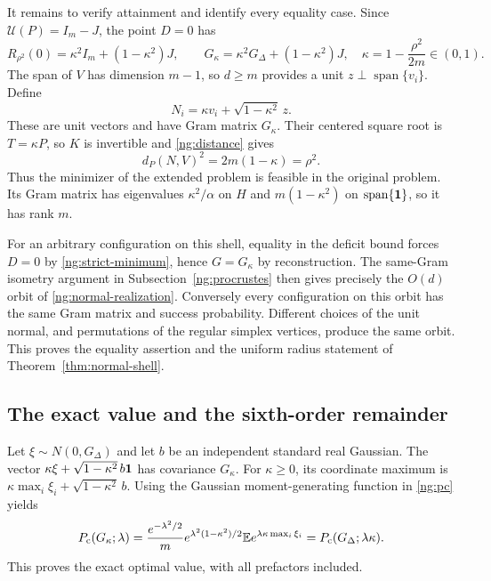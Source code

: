 It remains to verify attainment and identify every equality case.
Since $\mathcal U(P)=I_m-J$, the point $D=0$ has
\[
 R_{\rho^2}(0)=\kappa^2I_m+(1-\kappa^2)J,\qquad
 G_\kappa=\kappa^2G_\Delta+(1-\kappa^2)J,
 \quad \kappa=1-\frac{\rho^2}{2m}\in(0,1).
\]
The span of $V$ has dimension $m-1$, so $d\ge m$ provides a unit
$z\perp\operatorname{span}\{v_i\}$. Define
\begin{equation}\label{ng:normal-realization}
 N_i=\kappa v_i+\sqrt{1-\kappa^2}\,z.
\end{equation}
These are unit vectors and have Gram matrix $G_\kappa$.
Their centered square root is $T=\kappa P$, so $K$ is invertible and
\eqref{ng:distance} gives
\[
 d_P(N,V)^2=2m(1-\kappa)=\rho^2.
\]
Thus the minimizer of the extended problem is feasible in the original
problem. Its Gram matrix has eigenvalues $\kappa^2/\alpha$ on $H$
and $m(1-\kappa^2)$ on $\operatorname{span}\{\mathbf 1\}$, so it has rank $m$.

For an arbitrary configuration on this shell, equality in the deficit
bound forces $D=0$ by \eqref{ng:strict-minimum}, hence $G=G_\kappa$ by
reconstruction. The same-Gram isometry argument in
Subsection~\ref{ng:procrustes} then gives precisely the $O(d)$ orbit
of \eqref{ng:normal-realization}. Conversely every configuration on
this orbit has the same Gram matrix and success probability.
Different choices of the unit normal, and permutations of the regular
simplex vertices, produce the same orbit. This proves the equality
assertion and the uniform radius statement of
Theorem~\ref{thm:normal-shell}.

\subsection{The exact value and the sixth-order remainder}\label{ng:taylor}

Let $\xi\sim N(0,G_\Delta)$ and let $b$ be an independent standard real
Gaussian. The vector
$\kappa\xi+\sqrt{1-\kappa^2}\,b\mathbf 1$ has covariance $G_\kappa$.
For $\kappa\ge0$, its coordinate maximum is
$\kappa\max_i\xi_i+\sqrt{1-\kappa^2}\,b$.
Using the Gaussian moment-generating function in \eqref{ng:pc} yields
\begin{equation}\label{ng:exact-value}
 P_{\mathrm c}(G_\kappa;\lambda)
   =\frac{e^{-\lambda^2/2}}m
      e^{\lambda^2(1-\kappa^2)/2}
      \mathbb E e^{\lambda\kappa\max_i\xi_i}
   =P_{\mathrm c}(G_\Delta;\lambda\kappa).
\end{equation}
This proves the exact optimal value, with all prefactors included.

